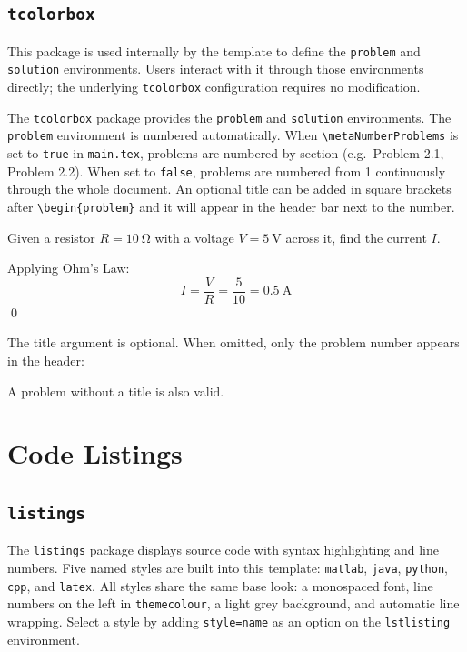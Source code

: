 \subsection{\texttt{tcolorbox}}
\noindent\colorbox{themecolour!15}{\parbox{\linewidth}{\small This package is used internally by the template to define the \texttt{problem} and \texttt{solution} environments. Users interact with it through those environments directly; the underlying \texttt{tcolorbox} configuration requires no modification.}}\vspace{0.5\baselineskip}

The \texttt{tcolorbox} package provides the \texttt{problem} and \texttt{solution} environments. The \texttt{problem} environment is numbered automatically. When \texttt{\textbackslash metaNumberProblems} is set to \texttt{true} in \texttt{main.tex}, problems are numbered by section (e.g.\ Problem 2.1, Problem 2.2). When set to \texttt{false}, problems are numbered from 1 continuously through the whole document. An optional title can be added in square brackets after \texttt{\textbackslash begin\{problem\}} and it will appear in the header bar next to the number.

\begin{problem}
	\label{prob:ohmslaw}
	Given a resistor $R = \SI{10}{\ohm}$ with a voltage $V = \SI{5}{\volt}$ across it,
	find the current $I$.
\end{problem}

\begin{solution}
	Applying Ohm's Law:
	\begin{equation}
		I = \frac{V}{R} = \frac{5}{10} = \SI{0.5}{\ampere}
	\end{equation}
	\qed
\end{solution}

The title argument is optional. When omitted, only the problem number appears in the header:

\begin{problem}
	\label{prob:problem}
	A problem without a title is also valid.
\end{problem}

\section{Code Listings}

\subsection{\texttt{listings}}
The \texttt{listings} package displays source code with syntax highlighting and line numbers. Five named styles are built into this template: \texttt{matlab}, \texttt{java}, \texttt{python}, \texttt{cpp}, and \texttt{latex}. All styles share the same base look: a monospaced font, line numbers on the left in \texttt{themecolour}, a light grey background, and automatic line wrapping. Select a style by adding \texttt{style=name} as an option on the \texttt{lstlisting} environment.

